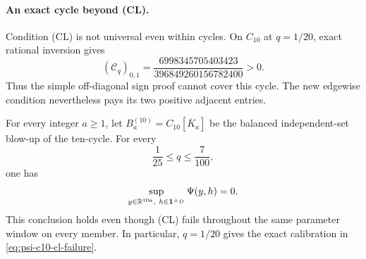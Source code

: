\documentclass[11pt]{article}
\begin{document}
\paragraph{An exact cycle beyond \textup{(CL)}.}
Condition \textup{(CL)} is not universal even within cycles.  On $C_{10}$
at $q=1/20$, exact rational inversion gives
\begin{equation}
 (\mathcal C_q)_{0,1}
 =\frac{6998345705403423}{396849260156782400}>0.
 \label{eq:psi-c10-cl-failure}
\end{equation}
Thus the simple off-diagonal sign proof cannot cover this cycle.  The new
edgewise condition nevertheless pays its two positive adjacent entries.

\begin{theorem}
\label{thm:psi-c10-edgewise}
For every integer $a\geq1$, let
$B_a^{(10)}=C_{10}[\overline K_a]$ be the balanced independent-set blow-up
of the ten-cycle.  For every
\begin{equation}
 \frac1{25}\leq q\leq\frac7{100},
 \label{eq:psi-c10-edgewise-q-window}
\end{equation}
one has
\begin{equation}
 \sup_{y\in\mathbb R^{10a},\ h\in\one^{\perp_D}}\Psi(y,h)=0.
 \label{eq:psi-c10-edgewise-sup}
\end{equation}
This conclusion holds even though \textup{(CL)} fails throughout the same
parameter window on every member.  In particular, $q=1/20$ gives the exact
calibration in \cref{eq:psi-c10-cl-failure}.
\end{theorem}
\end{document}
